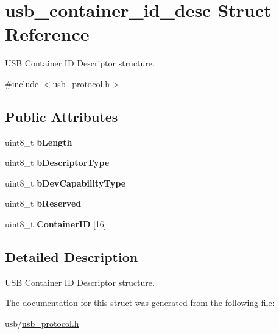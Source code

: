 \hypertarget{structusb__container__id__desc}{}\section{usb\+\_\+container\+\_\+id\+\_\+desc Struct Reference}
\label{structusb__container__id__desc}


U\+SB Container ID Descriptor structure.  




{\ttfamily \#include $<$usb\+\_\+protocol.\+h$>$}

\subsection*{Public Attributes}
\begin{DoxyCompactItemize}
\item 
\mbox{\label{structusb__container__id__desc_a0da1948007992b4769848c9bdcca3eaf}} 
uint8\+\_\+t {\bfseries b\+Length}
\item 
\mbox{\label{structusb__container__id__desc_ab088757f8c6837ce616245e6e3777bf9}} 
uint8\+\_\+t {\bfseries b\+Descriptor\+Type}
\item 
\mbox{\label{structusb__container__id__desc_a2ef7ec376b868dfed1ec87a6b9f5039e}} 
uint8\+\_\+t {\bfseries b\+Dev\+Capability\+Type}
\item 
\mbox{\label{structusb__container__id__desc_ad02d4fcfe469fefaa2bd586978996d96}} 
uint8\+\_\+t {\bfseries b\+Reserved}
\item 
\mbox{\label{structusb__container__id__desc_ad57542915e67b21dcc11f8380da1018d}} 
uint8\+\_\+t {\bfseries Container\+ID} \mbox{[}16\mbox{]}
\end{DoxyCompactItemize}


\subsection{Detailed Description}
U\+SB Container ID Descriptor structure. 

The documentation for this struct was generated from the following file\+:\begin{DoxyCompactItemize}
\item 
usb/\hyperlink{usb__protocol_8h}{usb\+\_\+protocol.\+h}\end{DoxyCompactItemize}
